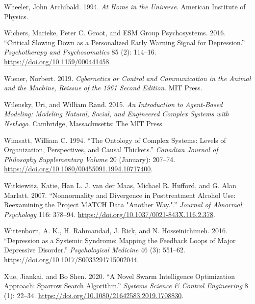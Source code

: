 \documentclass[
  a4paper,
  DIV=11,
  numbers=noendperiod,
  oneside]{scrreprt}
\newlength{\cslhangindent}
\newlength{\cslentryspacingunit} %
\newenvironment{CSLReferences}[2] %
 {%
  \setlength{\parindent}{0pt}
  \ifodd #1
  \let\oldpar\par
  \def\par{\hangindent=\cslhangindent\oldpar}
  \fi
  \setlength{\parskip}{#2\cslentryspacingunit}
 }%
 {}
\begin{document}
\begin{CSLReferences}{1}{0}
\leavevmode{}%
Wheeler, John Archibald. 1994. \emph{At {Home} in the {Universe}}.
{American Institute of Physics}.

\leavevmode{}%
Wichers, Marieke, Peter C. Groot, and ESM Group Psychosystems. 2016.
{``Critical {Slowing Down} as a {Personalized Early Warning Signal} for
{Depression}.''} \emph{Psychotherapy and Psychosomatics} 85 (2):
114--16. \url{https://doi.org/10.1159/000441458}.

\leavevmode{}%
Wiener, Norbert. 2019. \emph{Cybernetics or {Control} and
{Communication} in the {Animal} and the {Machine}, {Reissue} of the 1961
Second Edition}. {MIT Press}.

\leavevmode{}%
Wilensky, Uri, and William Rand. 2015. \emph{An Introduction to
Agent-Based Modeling: Modeling Natural, Social, and Engineered Complex
Systems with {NetLogo}}. {Cambridge, Massachusetts}: {The MIT Press}.

\leavevmode{}%
Wimsatt, William C. 1994. {``The Ontology of Complex Systems: Levels of
Organization, Perspectives, and Causal Thickets.''} \emph{Canadian
Journal of Philosophy Supplementary Volume} 20 (January): 207--74.
\url{https://doi.org/10.1080/00455091.1994.10717400}.

\leavevmode{}%
Witkiewitz, Katie, Han L. J. van der Maas, Michael R. Hufford, and G.
Alan Marlatt. 2007. {``Nonnormality and Divergence in Posttreatment
Alcohol Use: {Reexamining} the {Project MATCH} Data "Another Way.".''}
\emph{Journal of Abnormal Psychology} 116: 378--94.
\url{https://doi.org/10.1037/0021-843X.116.2.378}.

\leavevmode{}%
Wittenborn, A. K., H. Rahmandad, J. Rick, and N. Hosseinichimeh. 2016.
{``Depression as a Systemic Syndrome: Mapping the Feedback Loops of
Major Depressive Disorder.''} \emph{Psychological Medicine} 46 (3):
551--62. \url{https://doi.org/10.1017/S0033291715002044}.

\leavevmode{}%
Xue, Jiankai, and Bo Shen. 2020. {``A Novel Swarm Intelligence
Optimization Approach: Sparrow Search Algorithm.''} \emph{Systems
Science \& Control Engineering} 8 (1): 22--34.
\url{https://doi.org/10.1080/21642583.2019.1708830}.


\end{CSLReferences}
\end{document}

